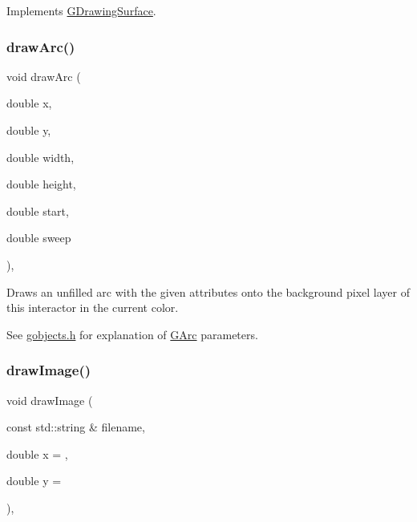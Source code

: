 Implements \mbox{\hyperlink{classGDrawingSurface_ae65b7cc9bdfbc1bd01bec80ba83aab47}{G\+Drawing\+Surface}}.

\mbox{\label{classGDrawingSurface_a38b6fae1045191c57092b49905068144}} 
\subsubsection{\texorpdfstring{draw\+Arc()}{drawArc()}}
{\footnotesize\ttfamily void draw\+Arc (\begin{DoxyParamCaption}\item[{double}]{x,  }\item[{double}]{y,  }\item[{double}]{width,  }\item[{double}]{height,  }\item[{double}]{start,  }\item[{double}]{sweep }\end{DoxyParamCaption})\hspace{0.3cm}{\ttfamily [virtual]}, {\ttfamily [inherited]}}



Draws an unfilled arc with the given attributes onto the background pixel layer of this interactor in the current color. 

See \mbox{\hyperlink{gobjects_8h_source}{gobjects.\+h}} for explanation of \mbox{\hyperlink{classGArc}{G\+Arc}} parameters. \mbox{\label{classGDrawingSurface_abdd4cb1f2c64adc5d03522a1ee30febf}} 
\subsubsection{\texorpdfstring{draw\+Image()}{drawImage()}}
{\footnotesize\ttfamily void draw\+Image (\begin{DoxyParamCaption}\item[{const std\+::string \&}]{filename,  }\item[{double}]{x = {},  }\item[{double}]{y = {} }\end{DoxyParamCaption})\hspace{0.3cm}{\ttfamily [virtual]}, {\ttfamily [inherited]}}



